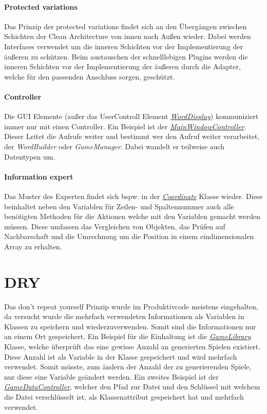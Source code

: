\paragraph{Protected variations}
Das Prinzip der protected variations findet sich an den Übergängen zwischen Schichten der Clean Architecture von innen nach Außen wieder. Dabei werden Interfaces verwendet um die inneren Schichten vor der Implementierung der äußeren zu schützen. Beim austauschen der schnelllebigen Plugins werden die inneren Schichten vor der Implementierung der äußeren durch die Adapter, welche für den passenden Anschluss sorgen, geschützt.

\paragraph{Controller}
Die GUI Elemente (außer das UserControll Element \href{https://github.com/EinToni/Wortfinder/blob/main/Wortfinder/WordDisplay.xaml.cs}{\textit{WordDisplay}}) kommuniziert immer nur mit einen Controller. Ein Beispiel ist der \href{https://github.com/EinToni/Wortfinder/blob/main/Wortfinder/MainWindowController.cs}{\textit{MainWindowController}}. Dieser Leitet die Aufrufe weiter und bestimmt wer den Aufruf weiter verarbeitet, der \textit{WordBuilder} oder \textit{GameManager}. Dabei wandelt er teilweise auch Datentypen um.

\paragraph{Information expert}
Das Muster des Experten findet sich bspw. in der \href{https://github.com/EinToni/Wortfinder/blob/main/Wortfinder/Coordinate.cs}{\textit{Coordinate}} Klasse wieder. Diese beinhaltet neben den Variablen für Zeilen- und Spaltennummer auch alle benötigten Methoden für die Aktionen welche mit den Variablen gemacht werden müssen. Diese umfassen das Vergleichen von Objekten, das Prüfen auf Nachbarschaft und die Umrechnung um die Position in einem eindimensionalen Array zu erhalten.

\section{DRY}
Das \glqq don't repeat yourself\grqq{} Prinzip wurde im Produktivcode meistens eingehalten, da versucht wurde die mehrfach verwendeten Informationen als Variablen in Klassen zu speichern und wiederzuverwenden. Somit sind die Informationen nur an einem Ort gespeichert. Ein Beispiel für die Einhaltung ist die \href{https://github.com/EinToni/Wortfinder/blob/main/Wortfinder/GameLibrary.cs}{\textit{GameLibrary}} Klasse, welche überprüft das eine gewisse Anzahl an generierten Spielen existiert. Diese Anzahl ist als Variable in der Klasse gespeichert und wird mehrfach verwendet. Somit müsste, zum ändern der Anzahl der zu generierenden Spiele, nur diese eine Variable geändert werden. Ein zweites Beispiel ist der \href{https://github.com/EinToni/Wortfinder/blob/main/Wortfinder/GameDataController.cs}{\textit{GameDataController}}, welcher den Pfad zur Datei und den Schlüssel mit welchem die Datei verschlüsselt ist, als Klassenattribut gespeichert hat und mehrfach verwendet.


